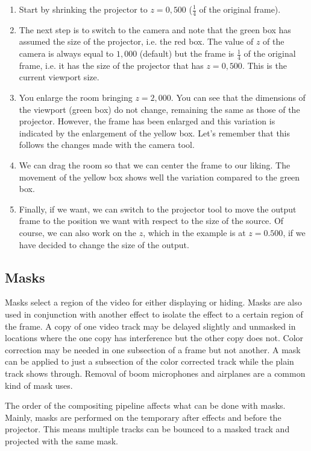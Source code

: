 \begin{enumerate}
    \item Start by shrinking the projector to $z=0,500$ ($\frac{1}{4}$ of the original frame).
    \item The next step is to switch to the camera and note that the green box has assumed the size of the projector, i.e. the red box. The value of $z$ of the camera is always equal to $1,000$ (default) but the frame is $\frac{1}{4}$ of the original frame, i.e. it has the size of the projector that has $z=0,500$. This is the current viewport size.
    \item You enlarge the room bringing $z=2,000$. You can see that the dimensions of the viewport (green box) do not change, remaining the same as those of the projector. However, the frame has been enlarged and this variation is indicated by the enlargement of the yellow box. Let's remember that this follows the changes made with the camera tool.
    \item We can drag the room so that we can center the frame to our liking. The movement of the yellow box shows well the variation compared to the green box.
    \item Finally, if we want, we can switch to the projector tool to move the output frame to the position we want with respect to the size of the source. Of course, we can also work on the $z$, which in the example is at $z=0.500$, if we have decided to change the size of the output.
\end{enumerate}

\subsection{Masks}%
\label{sub:masks}

Masks select a region of the video for either displaying or hiding. 
Masks are also used in conjunction with another effect to isolate the effect to a certain region of the frame. 
A copy of one video track may be delayed slightly and unmasked in locations where the one copy has interference but the other copy does not. 
Color correction may be needed in one subsection of a frame but not another. 
A mask can be applied to just a subsection of the color corrected track while the plain track shows through. 
Removal of boom microphones and airplanes are a common kind of mask uses.

The order of the compositing pipeline affects what can be done with masks. Mainly, masks are performed on the temporary after effects and before the projector. This means multiple tracks can be bounced to a masked track and projected with the same mask.

